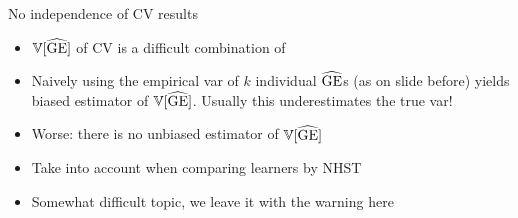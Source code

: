 
\begin{vbframe}{No independence of CV results}

\begin{itemize}
\item $\mathbb{V}[\widehat{\mathrm{GE}}]$ of CV is a difficult combination of 
\begin{itemize}
\end{itemize}
\item Naively using the empirical var of $k$ individual $\widehat{\mathrm{GE}}$s (as on slide before) yields biased 
estimator of $\mathbb{V}[\widehat{\mathrm{GE}}]$. Usually this underestimates the true var!
\item Worse: there is no unbiased estimator of $\mathbb{V}[\widehat{\mathrm{GE}}]$ 
\item Take into account when comparing learners by NHST
\item Somewhat difficult topic, we leave it with the warning here
\end{itemize}

\end{vbframe}






